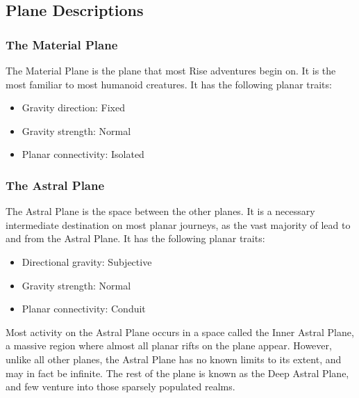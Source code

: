 
    \subsection{Plane Descriptions}
        \subsubsection{The Material Plane}
            The Material Plane is the plane that most Rise adventures begin on.
            It is the most familiar to most humanoid creatures.
            It has the following planar traits:
            \begin{itemize}
                \item Gravity direction: Fixed
                \item Gravity strength: Normal
                \item Planar connectivity: Isolated
            \end{itemize}

        \subsubsection{The Astral Plane}\label{The Astral Plane}
            The Astral Plane is the space between the other planes.
            It is a necessary intermediate destination on most planar journeys, as the vast majority of  lead to and from the Astral Plane.
            It has the following planar traits:
            \begin{itemize}
                \item Directional gravity: Subjective
                \item Gravity strength: Normal
                \item Planar connectivity: Conduit
            \end{itemize}

            Most activity on the Astral Plane occurs in a space called the Inner Astral Plane, a massive region where almost all planar rifts on the plane appear.
            However, unlike all other planes, the Astral Plane has no known limits to its extent, and may in fact be infinite.
            The rest of the plane is known as the Deep Astral Plane, and few venture into those sparsely populated realms.
